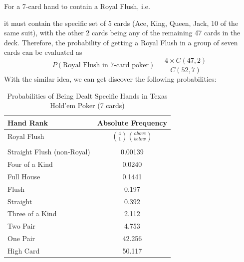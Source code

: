 \documentclass{article}
\begin{document}
For a 7-card hand to contain a Royal Flush, i.e.
\begin{center}
\end{center}
it must contain the specific set of 5 cards 
(Ace, King, Queen, Jack, 10 of the same suit), 
with the other 2 cards being any of the remaining 47 cards in the deck. 
Therefore, the probability of getting a Royal Flush in a group of seven 
cards can be evaluated as 
\[
P(\text{Royal Flush in 7-card poker}) = \frac{4 \times C(47, 2)}{C(52, 7)}
\]
With the similar idea, we can get discover the following probabilities:
\begin{table}[ht]
    \centering
    \caption{Probabilities of Being Dealt Specific Hands in Texas Hold'em Poker (7 cards)}
    \label{tab:poker_hands}
    \begin{tabularx}{\textwidth}{@{}Xc@{}} %
    \toprule
    Hand Rank                  & Absolute Frequency \\ \midrule
    Royal Flush                & $\displaystyle \binom{4}{1} \binom{above}{below}$       \\
    \\
    Straight Flush (non-Royal) & 0.00139          \\
    Four of a Kind             & 0.0240           \\
    Full House                 & 0.1441           \\
    Flush                      & 0.197            \\
    Straight                   & 0.392            \\
    Three of a Kind            & 2.112            \\
    Two Pair                   & 4.753            \\
    One Pair                   & 42.256           \\
    High Card                  & 50.117           \\ \bottomrule
    \end{tabularx}
\end{table}
\end{document}
